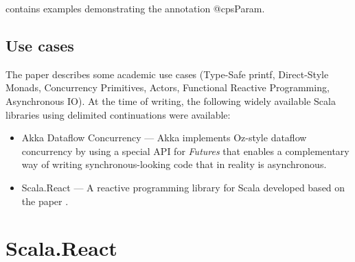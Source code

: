  contains examples demonstrating the annotation @cpsParam.

\subsection{Use cases}

The paper \cite{CPSTransform} describes some academic use cases (Type-Safe printf, Direct-Style Monads, Concurrency Primitives, Actors, Functional Reactive Programming, Asynchronous IO). At the time of writing, the following widely available Scala libraries using delimited continuations were available:
\begin{itemize}
\item Akka Dataflow Concurrency --- Akka implements Oz-style dataflow concurrency by using a special API for \emph{Futures} that enables a complementary way of writing synchronous-looking code that in reality is asynchronous. \cite{AkkaDataflow}
\item Scala.React --- A reactive programming library for Scala developed based on the paper \cite{DeprecatingObservers}.

\end{itemize}





\section{Scala.React}\label{sec:theory_scala-react}

